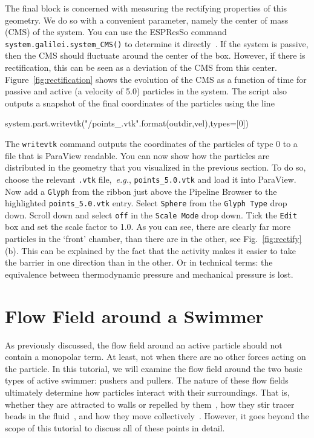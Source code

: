 \documentclass[aip,jcp,reprint,a4paper,onecolumn,amsmath]{revtex4-1}
\newcommand\code{\lstinline}
\newcommand{\es}{\mbox{\textsf{ESPResSo}}\xspace}
\newcommand\codees{\lstinline[language=python]}
\begin{document}
The final block is concerned with measuring the rectifying properties of this geometry. We do so with a convenient parameter, namely the center of mass (CMS) of the system. You can use the \es{} command \codees{system.galilei.system_CMS()} to determine it directly~\cite{UG}. If the system is passive, then the CMS should fluctuate around the center of the box. However, if there is rectification, this can be seen as a deviation of the CMS from this center. Figure~\ref{fig:rectification} shows the evolution of the CMS as a function of time for passive and active (a velocity of 5.0) particles in the system. The script also outputs a snapshot of the final coordinates of the particles using the line
\begin{espresso}
system.part.writevtk("{}/points_{}.vtk".format(outdir,vel),types=[0])
\end{espresso}
The \codees{writevtk} command outputs the coordinates of the particles of type 0 to a file that is ParaView readable. You can now show how the particles are distributed in the geometry that you visualized in the previous section. To do so, choose the relevant \code{.vtk} file,~\textit{e.g.}, \code{points_5.0.vtk} and load it into ParaView. Now add a \code{Glyph} from the ribbon just above the Pipeline Browser to the highlighted \code{points_5.0.vtk} entry. Select \code{Sphere} from the \code{Glyph Type} drop down. Scroll down and select \code{off} in the \code{Scale Mode} drop down. Tick the \code{Edit} box and set the scale factor to 1.0. As you can see, there are clearly far more particles in the `front' chamber, than there are in the other, see Fig.~\ref{fig:rectify}(b). This can be explained by the fact that the activity makes it easier to take the barrier in one direction than in the other. Or in technical terms: the equivalence between thermodynamic pressure and mechanical pressure is lost.

\section{\label{sec:flow}Flow Field around a Swimmer}

As previously discussed, the flow field around an active particle should not contain a monopolar term. At least, not when there are no other forces acting on the particle. In this tutorial, we will examine the flow field around the two basic types of active swimmer: pushers and pullers. The nature of these flow fields ultimately determine how particles interact with their surroundings. That is, whether they are attracted to walls or repelled by them~\cite{Spagnolie_12}, how they stir tracer beads in the fluid~\cite{Morozov_14}, and how they move collectively~\cite{Zoettl_14}. However, it goes beyond the scope of this tutorial to discuss all of these points in detail.
\end{document}
